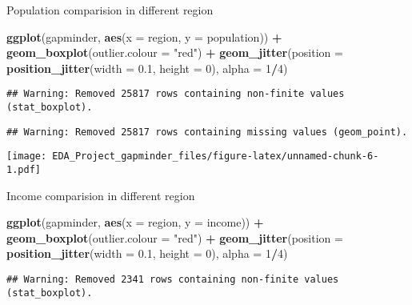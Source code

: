 \documentclass[]{article}
\newenvironment{Shaded}{\begin{snugshade}}{\end{snugshade}}
\newcommand{\KeywordTok}[1]{\textcolor[rgb]{0.13,0.29,0.53}{\textbf{#1}}}
\newcommand{\DataTypeTok}[1]{\textcolor[rgb]{0.13,0.29,0.53}{#1}}
\newcommand{\DecValTok}[1]{\textcolor[rgb]{0.00,0.00,0.81}{#1}}
\newcommand{\FloatTok}[1]{\textcolor[rgb]{0.00,0.00,0.81}{#1}}
\newcommand{\StringTok}[1]{\textcolor[rgb]{0.31,0.60,0.02}{#1}}
\newcommand{\OperatorTok}[1]{\textcolor[rgb]{0.81,0.36,0.00}{\textbf{#1}}}
\newcommand{\NormalTok}[1]{#1}
\begin{document}
Population comparision in different region

\begin{Shaded}
\begin{Highlighting}[]
\KeywordTok{ggplot}\NormalTok{(gapminder, }\KeywordTok{aes}\NormalTok{(}\DataTypeTok{x =}\NormalTok{ region, }\DataTypeTok{y =}\NormalTok{ population)) }\OperatorTok{+}\StringTok{  }\KeywordTok{geom_boxplot}\NormalTok{(}\DataTypeTok{outlier.colour =} \StringTok{"red"}\NormalTok{) }\OperatorTok{+}\StringTok{  }\KeywordTok{geom_jitter}\NormalTok{(}\DataTypeTok{position =} \KeywordTok{position_jitter}\NormalTok{(}\DataTypeTok{width =} \FloatTok{0.1}\NormalTok{, }\DataTypeTok{height =} \DecValTok{0}\NormalTok{), }\DataTypeTok{alpha =} \DecValTok{1}\OperatorTok{/}\DecValTok{4}\NormalTok{)}
\end{Highlighting}
\end{Shaded}

\begin{verbatim}
## Warning: Removed 25817 rows containing non-finite values (stat_boxplot).
\end{verbatim}

\begin{verbatim}
## Warning: Removed 25817 rows containing missing values (geom_point).
\end{verbatim}

\texttt{[image: EDA\_Project\_gapminder\_files/figure-latex/unnamed-chunk-6-1.pdf]}

Income comparision in different region

\begin{Shaded}
\begin{Highlighting}[]
\KeywordTok{ggplot}\NormalTok{(gapminder, }\KeywordTok{aes}\NormalTok{(}\DataTypeTok{x =}\NormalTok{ region, }\DataTypeTok{y =}\NormalTok{ income)) }\OperatorTok{+}\StringTok{  }\KeywordTok{geom_boxplot}\NormalTok{(}\DataTypeTok{outlier.colour =} \StringTok{"red"}\NormalTok{) }\OperatorTok{+}\StringTok{  }\KeywordTok{geom_jitter}\NormalTok{(}\DataTypeTok{position =} \KeywordTok{position_jitter}\NormalTok{(}\DataTypeTok{width =} \FloatTok{0.1}\NormalTok{, }\DataTypeTok{height =} \DecValTok{0}\NormalTok{), }\DataTypeTok{alpha =} \DecValTok{1}\OperatorTok{/}\DecValTok{4}\NormalTok{)}
\end{Highlighting}
\end{Shaded}

\begin{verbatim}
## Warning: Removed 2341 rows containing non-finite values (stat_boxplot).
\end{verbatim}
\end{document}
